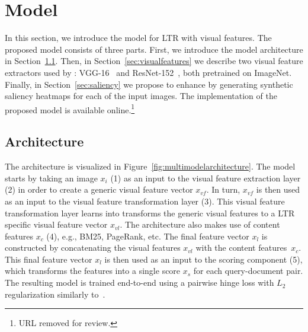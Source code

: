 
\section{\protect\datasetname{} Model}
In this section, we introduce the \datasetname{} model for \ac{LTR} with visual features.
The proposed model consists of three parts.
First, we introduce the model architecture in Section~\ref{sec:multimodal}.
Then, in Section~\ref{sec:visualfeatures} we describe two visual feature extractors used by \datasetname{}:
VGG-16~\cite{simonyan2014very} and ResNet-152~\cite{he2016deep}, both pretrained on ImageNet.
Finally, in Section~\ref{sec:saliency} we propose to enhance \datasetname{} by generating synthetic saliency heatmaps for each of the input images.
The implementation of the proposed \datasetname{} model is available online.\footnote{URL removed for review.}

\subsection{Architecture} \label{sec:multimodal}
The \datasetname{} architecture is visualized in Figure~\ref{fig:multimodelarchitecture}. 
The model starts by taking an image $x_i$ (1) as an input to the visual feature extraction layer (2) in order to create a generic visual feature vector $x_{vf}$. In turn, $x_{vf}$ is then used as an input to the visual feature transformation layer (3).
This visual feature transformation layer learns into transforms the generic visual features to a \ac{LTR} specific visual feature vector $x_{vl}$.
%
The \datasetname{} architecture also makes use of content features $x_{c}$ (4), e.g., BM25, PageRank, etc.
The final feature vector $x_{l}$ is constructed by concatenating the visual features $x_{vl}$ with the content features~$x_{c}$.
%
This final feature vector $x_{l}$ is then used as an input to the scoring component (5),
which transforms the features into a single score $x_s$ for each query-document pair.
The resulting model is trained end-to-end using a pairwise hinge loss with $L_2$ regularization similarly to~\cite{fan2017learning}.

